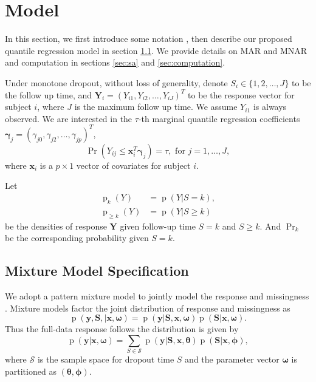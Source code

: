 \documentclass[12pt]{article}
\DeclareMathOperator{\pr}{p}
\DeclareMathOperator{\prob}{Pr}
\begin{document}
\section{Model}
\label{sec:model}

In this section, we first introduce some notation
, then describe our proposed quantile regression model in
section \ref{sec:settings}. We provide details on MAR and MNAR
and computation in sections \ref{sec:sa} and \ref{sec:computation}.

Under monotone dropout, without loss of generality, denote $S_i \in
\{1, 2, \ldots, J\}$ to be the follow up time, and $\bm Y_i = (Y_{i1},
Y_{i2}, \ldots, Y_{iJ})^{T}$ to be the response vector for subject
$i$, where $J$ is the maximum follow up time. We assume $Y_{i1}$ is
always observed. We are interested in the $\tau$-th marginal quantile
regression coefficients $\bm \gamma_j = (\gamma_{j0}, \gamma_{j2},
\ldots, \gamma_{jp})^T$,
\begin{equation}
  \label{eq:quantile}
  \prob (Y_{ij} \leq \bm x_i^{T} \bm \gamma_j ) = \tau, \text{ for } j = 1, \ldots, J,
\end{equation}
where $\bm x_i$ is a $p \times 1$ vector of covariates for subject $i$.

Let
\begin{align*}
  \pr_k(Y) &= \pr (Y | S = k), \\
  \pr_{\geq k} (Y) & = \pr (Y | S \geq k)
\end{align*}
be the densities of response $\bm Y$ given follow-up time $S=k$ and $S
\geq k$. And $\prob_k$ be the corresponding probability given $S = k$.

\subsection{Mixture Model Specification}
\label{sec:settings}
We adopt a pattern mixture model to jointly model the response and
missingness \citep{little1994, dh2008}. Mixture models factor the
joint distribution of response and missingness as
\begin{displaymath}
  \pr (\bm y, \bm S, |\bm x, \bm \omega) = \pr (\bm y|\bm S, \bm x, \bm \omega) \pr (\bm S | \bm x, \bm \omega).
\end{displaymath}
Thus the full-data response follows the distribution is given by
\begin{displaymath}
  \pr (\bm y | \bm x, \bm \omega) = \sum_{S \in \mathcal{S}} \pr(\bm y| \bm S, \bm x, \bm \theta) \pr (\bm S | \bm x, \bm \phi),
\end{displaymath}
where $\mathcal{S}$ is the sample space for dropout time $S$ and the
parameter vector $\bm \omega$ is partitioned as $(\bm \theta, \bm
\phi)$.
\end{document}
